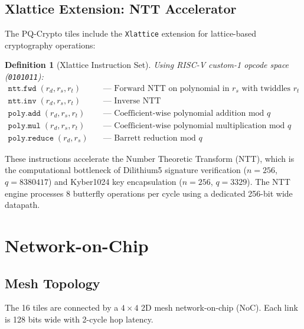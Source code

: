 \documentclass[11pt,a4paper]{article}
\newtheorem{definition}[theorem]{Definition}
\begin{document}
\subsection{Xlattice Extension: NTT Accelerator}

The PQ-Crypto tiles include the \texttt{Xlattice} extension for lattice-based cryptography operations:

\begin{definition}[Xlattice Instruction Set]
\label{def:xlattice}
Using RISC-V custom-1 opcode space (\texttt{0101011}):
\begin{align}
    \texttt{ntt.fwd}\;(r_d, r_s, r_t) &\quad\text{--- Forward NTT on polynomial in } r_s \text{ with twiddles } r_t \\
    \texttt{ntt.inv}\;(r_d, r_s, r_t) &\quad\text{--- Inverse NTT} \\
    \texttt{poly.add}\;(r_d, r_s, r_t) &\quad\text{--- Coefficient-wise polynomial addition mod } q \\
    \texttt{poly.mul}\;(r_d, r_s, r_t) &\quad\text{--- Coefficient-wise polynomial multiplication mod } q \\
    \texttt{poly.reduce}\;(r_d, r_s) &\quad\text{--- Barrett reduction mod } q
\end{align}
\end{definition}

These instructions accelerate the Number Theoretic Transform (NTT), which is the computational bottleneck of Dilithium5 signature verification ($n = 256$, $q = 8380417$) and Kyber1024 key encapsulation ($n = 256$, $q = 3329$). The NTT engine processes 8 butterfly operations per cycle using a dedicated 256-bit wide datapath.

\section{Network-on-Chip}
\label{sec:noc}

\subsection{Mesh Topology}

The 16 tiles are connected by a $4 \times 4$ 2D mesh network-on-chip (NoC). Each link is 128 bits wide with 2-cycle hop latency.
\end{document}
